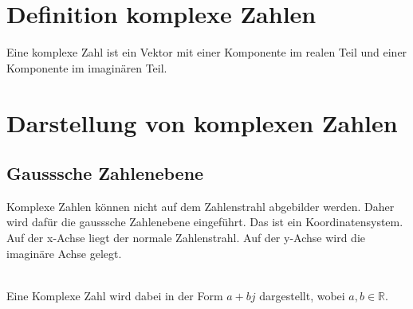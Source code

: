 



\section{Definition komplexe Zahlen}
Eine komplexe Zahl ist ein Vektor mit einer Komponente im realen Teil und 
einer Komponente im imaginären Teil. 

\section{Darstellung von komplexen Zahlen}
\subsection{Gausssche Zahlenebene}
Komplexe Zahlen können nicht auf dem Zahlenstrahl abgebilder werden. Daher wird 
dafür die gausssche Zahlenebene eingeführt. Das ist ein Koordinatensystem. Auf 
der x-Achse liegt der normale Zahlenstrahl. Auf der y-Achse wird die imaginäre 
Achse gelegt. 
\\
\\
Eine Komplexe Zahl wird dabei in der Form $a+bj$ dargestellt, wobei $a, b \in \mathbb{R}$. 


